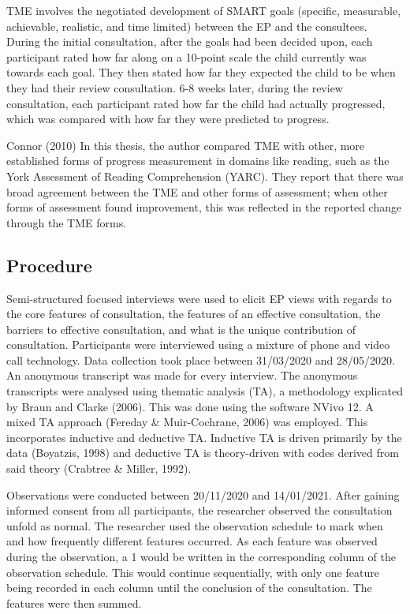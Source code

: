 \documentclass[
  english,
  man,floatsintext]{apa6}
\begin{document}
TME involves the negotiated development of SMART
goals (specific, measurable, achievable, realistic, and time limited)
between the EP and the consultees. During the initial
consultation, after the goals had been decided upon, each participant
rated how far along on a 10-point scale the child currently was towards
each goal. They then stated how far they expected the child to be when
they had their review consultation. 6-8 weeks later, during the review
consultation, each participant rated how far the child had actually
progressed, which was compared with how far they were predicted to
progress.

Connor (2010)
In this thesis, the author
compared TME with other, more established forms of progress measurement
in domains like reading, such as the York Assessment of Reading
Comprehension (YARC). They report that there was broad agreement between
the TME and other forms of assessment; when other forms of assessment
found improvement, this was reflected in the reported change through the
TME forms.

\hypertarget{procedure}{%
\subsection{Procedure}\label{procedure}}

Semi-structured focused interviews were used to elicit EP views with regards to the core features of consultation, the features of an effective consultation, the barriers to effective consultation, and what is the unique contribution of consultation. Participants were interviewed using a mixture of phone and
video call technology. Data collection took place between 31/03/2020 and
28/05/2020. An anonymous transcript was made for every interview. The anonymous transcripts were analysed using thematic analysis (TA), a methodology explicated by Braun and Clarke (2006). This was done using the software
NVivo 12. A mixed TA approach (Fereday \& Muir-Cochrane, 2006) was
employed. This incorporates inductive and deductive TA. Inductive TA is
driven primarily by the data
(Boyatzis, 1998) and deductive TA is
theory-driven with codes derived from said theory
(Crabtree \& Miller, 1992).

Observations were conducted between 20/11/2020 and 14/01/2021. After
gaining informed consent from all participants, the researcher observed
the consultation unfold as normal. The researcher used the observation
schedule to mark when and how frequently different features occurred. As
each feature was observed during the observation, a 1 would be written
in the corresponding column of the observation schedule. This would
continue sequentially, with only one feature being recorded in each
column until the conclusion of the consultation. The features were then
summed.
\end{document}
